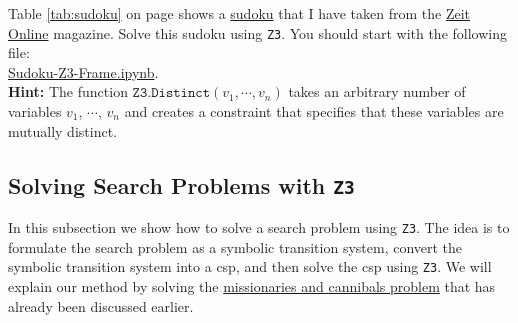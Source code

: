 \exerciseEng
{}
Table \ref{tab:sudoku} on page \pageref{tab:sudoku} shows a \href{https://en.wikipedia.org/wiki/Sudoku}{sudoku}
that I have taken from the
\href{http://sudoku.zeit.de/cgi-bin/sudoku/sudoku_kd_app_2016.pl?action=level&kd_nr=24091123601092&year=2018&month=03&day=23&level=-c+5}{Zeit Online}
magazine.
Solve this sudoku using \texttt{Z3}.  You should start with the following file:
\\[0.2cm]
\hspace*{1.3cm}
\href{https://github.com/karlstroetmann/Logic/blob/master/TypeScript/Chapter-5/Sudoku-Z3-Frame.ipynb}{Sudoku-Z3-Frame.ipynb}.
\\[0.2cm]
\textbf{Hint:} The function $\texttt{Z3.Distinct}(v_1, \cdots, v_n)$ takes an arbitrary number of variables
$v_1$, $\cdots$, $v_n$ and creates a constraint that specifies that these variables are mutually distinct.
\eox

\subsection{Solving Search Problems with \texttt{Z3}}
In this subsection we show how to solve a search problem using \texttt{Z3}.  The idea is to formulate the
search problem as a symbolic transition system, convert the symbolic transition system into a \Gls{csp}, and
then solve the \Gls{csp} using \texttt{Z3}.
We will explain our method by solving the
\href{https://en.wikipedia.org/wiki/Missionaries_and_cannibals_problem}{missionaries and cannibals problem}
that has already been discussed earlier.  

